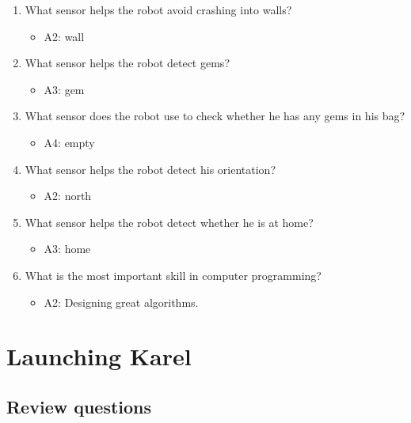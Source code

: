 \documentclass[article,A4,12pt]{llncs}
\begin{document}
\begin{enumerate}
\begin{itemize}
  \end{itemize}
\item What sensor helps the robot avoid crashing into walls?
  \begin{itemize}
    \item A2: wall
  \end{itemize}
\item What sensor helps the robot detect gems?
  \begin{itemize}
    \item A3: gem
  \end{itemize}
\item What sensor does the robot use to check whether he has any gems in his bag?
  \begin{itemize}
    \item A4: empty
  \end{itemize}
\item What sensor helps the robot detect his orientation?
  \begin{itemize}
    \item A2: north
  \end{itemize}
\item What sensor helps the robot detect whether he is at home?
  \begin{itemize}
    \item A3: home
  \end{itemize}
\item What is the most important skill in computer programming?
  \begin{itemize}
    \item A2: Designing great algorithms.
  \end{itemize}
\end{enumerate}

\section{Launching Karel}

\subsection{Review questions}
\end{document}
